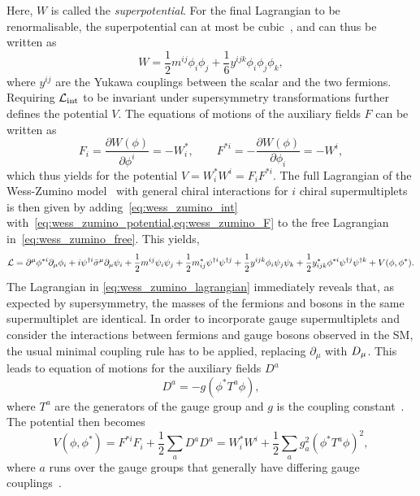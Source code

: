 Here, $W$ is called the \textit{superpotential}. For the final Lagrangian to be renormalisable, the superpotential can at most be cubic~\cite{Bustamante:2009us}, and can thus be written as
\begin{equation}
	W = \frac{1}{2}m^{ij}\phi_i \phi_j + \frac{1}{6}y^{ijk}\phi_i \phi_j \phi_k,
	\label{eq:wess_zumino_potential}
\end{equation}
where $y^{ij}$ are the Yukawa couplings between the scalar and the two fermions. Requiring $\mathcal{L}_\mathrm{int}$ to be invariant under supersymmetry transformations further defines the potential $V$. The equations of motions of the auxiliary fields $F$ can be written as
\begin{equation}
	F_i = \frac{\partial W(\phi)}{\partial \phi^i} = - W^*_i, \qquad F^{*i} = - \frac{\partial W(\phi)}{\partial \phi_i} = - W^i,
	\label{eq:wess_zumino_F}
\end{equation} 
which thus yields for the potential $V = W^*_iW^i = F_iF^{*i}$. The full Lagrangian of the Wess-Zumino model~\cite{Martin:1997ns} with general chiral interactions for $i$ chiral supermultiplets is then given by adding~\cref{eq:wess_zumino_int} with~\cref{eq:wess_zumino_potential,eq:wess_zumino_F} to the free Lagrangian in~\cref{eq:wess_zumino_free}. This yields,
\begin{equation}
	\mathcal{L} = \partial^\mu\phi^{*i}\partial_\mu\phi_i + i\psi^{\dagger i}\bar{\sigma}^\mu\partial_\mu\psi_i + \frac{1}{2} m^{ij}\psi_i \psi_j + \frac{1}{2} m_{ij}^* \psi^{\dagger i} \psi^{\dagger j} + \frac{1}{2} y^{ijk} \phi_i \psi_j \psi_k + \frac{1}{2} y^*_{ijk} \phi^{*i} \psi^{\dagger j} \psi^{\dagger k} + V(\phi,\phi^*).
	\label{eq:wess_zumino_lagrangian}
\end{equation}
The Lagrangian in \cref{eq:wess_zumino_lagrangian} immediately reveals that, as expected by supersymmetry, the masses of the fermions and bosons in the same supermultiplet are identical. In order to incorporate gauge supermultiplets and consider the interactions between fermions and gauge bosons observed in the SM, the usual minimal coupling rule has to be applied, replacing $\partial_\mu$ with $\mathop{}\!D_\mu$. This leads to equation of motions for the auxiliary fields $D^a$
\begin{equation}
	D^a = -g(\phi^*T^a\phi),
\end{equation}
where $T^a$ are the generators of the gauge group and $g$ is the coupling constant~\cite{Martin:1997ns}. The potential then becomes
\begin{equation}
	V(\phi,\phi^*) = F^{*i}F_i + \frac{1}{2} \sum_a{D^aD^a} = W^*_iW^i + \frac{1}{2}\sum_a{g^2_a(\phi^*T^a\phi)^2} ,
\end{equation}
where $a$ runs over the gauge groups that generally have differing gauge couplings~\cite{Martin:1997ns,Bustamante:2009us}.


